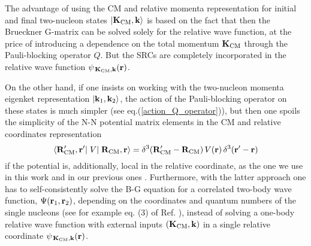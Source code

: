 \documentclass[aps,twocolumn,showpacs,preprintnumbers,amsmath,amssymb,nofootinbib,superscriptaddress,showkeys,noeprint]{revtex4-1}
\newcommand{\nk}{{\bf k}}
\newcommand{\nK}{{\bf K}}
\newcommand{\nr}{{\bf r}}
\newcommand{\nR}{{\bf R}}
\begin{document}
The advantage of using the CM and relative momenta representation for
initial and final two-nucleon states $\left|\nK_{\rm
  CM},\nk\right\rangle$ is based on the fact that then the Brueckner
G-matrix can be solved solely for the relative wave function, at the
price of introducing a dependence on the total momentum $\nK_{\rm CM}$
through the Pauli-blocking operator $Q$. But the SRCs are completely
incorporated in the relative wave function $\psi_{\,\nK_{\rm
    CM},\nk}(\nr)$.

On the other hand, if one insists on working with the two-nucleon
momenta eigenket representation $\left|\nk_1,\nk_2\right\rangle$, the
action of the Pauli-blocking operator on these states is much simpler
(see eq.(\ref{action_Q_operator})), but then one spoils the simplicity
of the N-N potential matrix elements in the CM and relative
coordinates representation
\begin{equation}\label{pot_mat_elem}
\left\langle\nR^\prime_{\rm CM},\nr^\prime\right|\left.V\right|
\left.\nR_{\rm CM},\nr\right\rangle=\delta^3(\nR^\prime_{\rm CM}-
\nR_{\rm CM})\, V(\nr)\, \delta^3(\nr^\prime-\nr)
\end{equation}
if the potential is, additionally, local in the relative coordinate,
as the one we use in this work and in our previous ones
\cite{RuizSimo:2016vsh, Perez:2013mwa, Perez:2013jpa,
  RuizSimo:2017tcb}. Furthermore, with the latter approach one has to
self-consistently solve the B-G equation for a correlated two-body
wave function, $\Psi(\nr_1,\nr_2)$, depending on the coordinates and
quantum numbers of the single nucleons (see for example eq. (3) of
Ref. \cite{RuizSimo:2016vsh}), instead of solving a one-body relative
wave function with external inputs $(\nK_{\rm CM},\nk)$ in a single
relative coordinate $\psi_{\,\nK_{\rm CM},\nk}(\nr)$.
 
\end{document}
